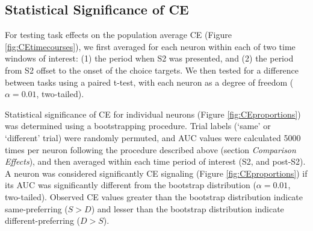 \subsection*{Statistical Significance of CE}
For testing task effects on the population average CE (Figure \ref{fig:CEtimecourses}), we first averaged for each neuron within each of two time windows of interest: (1) the period when S2 was presented, and (2) the period from S2 offset to the onset of the choice targets. 
We then tested for a difference between tasks using a paired t-test, with each neuron as a degree of freedom ($\alpha=0.01$, two-tailed).

Statistical significance of CE for individual neurons (Figure \ref{fig:CEproportions}) was determined using a bootstrapping procedure. Trial labels (`same' or `different' trial) were randomly permuted, and AUC values were calculated 5000 times per neuron following the procedure described above (section \textit{Comparison Effects}), and then averaged within each time period of interest (S2, and post-S2). A neuron was considered significantly CE signaling (Figure \ref{fig:CEproportions}) if its AUC was significantly different from the bootstrap distribution ($\alpha=0.01$, two-tailed). Observed CE values greater than the bootstrap distribution indicate same-preferring ($S>D$) and lesser than the bootstrap distribution indicate different-preferring ($D>S$).

